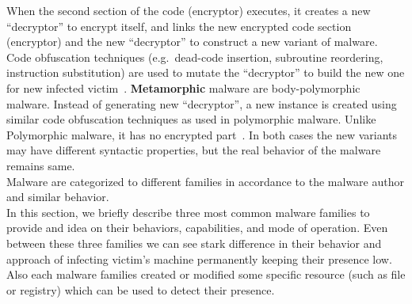 When the second section of the code (encryptor) executes, it creates a new ``decryptor'' to encrypt itself, and links the new encrypted code section (encryptor) and the new ``decryptor'' to construct a new variant of malware.
Code obfuscation techniques (e.g.\ dead-code insertion, subroutine reordering, instruction substitution) are used to mutate the ``decryptor'' to build the new one for new infected victim~\cite[]{rad2011evolution}.
\textbf{Metamorphic} malware are body-polymorphic malware.
Instead of generating new ``decryptor'', a new instance is created using similar code obfuscation techniques as used in polymorphic malware.
Unlike Polymorphic malware, it has no encrypted part~\cite[]{rad2012camouflage}.
In both cases the new variants may have different syntactic properties, but the real behavior of the malware remains same.\\

Malware are categorized to different families in accordance to the malware author and similar behavior.\\
In this section, we briefly describe three most common malware families to provide and idea on their behaviors, capabilities, and mode of operation.
Even between these three families we can see stark difference in their behavior and approach of infecting victim's machine permanently keeping their presence low.
Also each malware families created or modified some specific resource (such as file or registry) which can be used to detect their presence.
